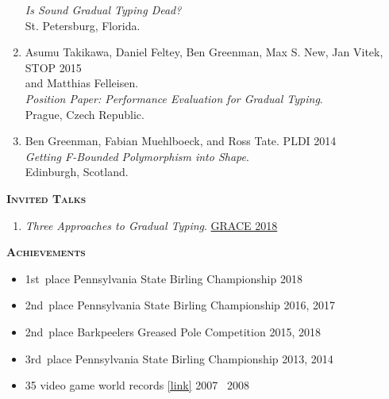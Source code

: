 \documentclass{article}
\newcommand{\mysection}[1]{\vspace{0.5cm}
\hspace{-1.3cm}\textsc{\textbf{#1}}~\hrulefill}
\begin{document}
\begin{enumerate}
   \emph{Is Sound Gradual Typing Dead?} \\
  St. Petersburg, Florida.
\item
  Asumu Takikawa, Daniel Feltey, Ben Greenman, Max S. New, Jan Vitek, \hfill STOP 2015 \\
   and Matthias Felleisen. \\
   \emph{Position Paper: Performance Evaluation for Gradual Typing}. \\
  Prague, Czech Republic.
\item
  Ben Greenman, Fabian Muehlboeck, and Ross Tate. \hfill PLDI 2014 \\
  \emph{Getting F-Bounded Polymorphism into Shape}. \\
  Edinburgh, Scotland.
\end{enumerate}

\mysection{Invited Talks}
\begin{enumerate}
\item \emph{Three Approaches to Gradual Typing}. \hfill \href{https://2018.splashcon.org/track/grace-2018-papers}{GRACE 2018}
\end{enumerate}

\mysection{Achievements}

\begin{itemize}
\item 1st~place Pennsylvania State Birling Championship \hfill 2018
\item 2nd~place Pennsylvania State Birling Championship \hfill 2016, 2017
\item 2nd~place Barkpeelers Greased Pole Competition \hfill 2015, 2018
\item 3rd~place Pennsylvania State Birling Championship \hfill 2013, 2014
\item 35 video game world records \href{https://www.twingalaxies.com/scores.php?player=43761}{[link]} \hfill 2007 \textendash\ 2008
\end{itemize}
\end{document}
